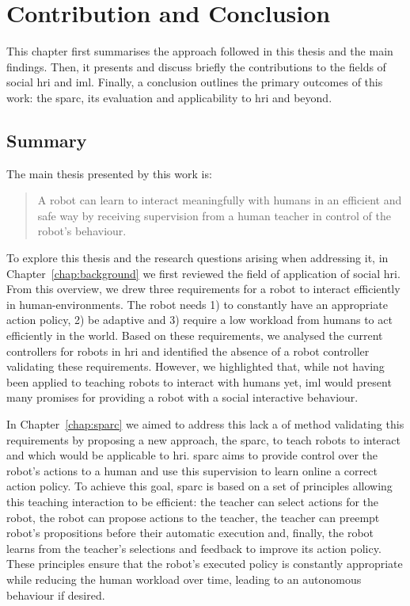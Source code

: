 \chapter{Contribution and Conclusion} \label{chap:conclusion}
\glsresetall

This chapter first summarises the approach followed in this thesis and the main findings. Then, it presents and discuss briefly the contributions to the fields of social \gls{hri} and \gls{iml}. Finally, a conclusion outlines the primary outcomes of this work: the \acrfull{sparc}, its evaluation and applicability to \gls{hri} and beyond.

\section{Summary}\label{sec:conc_summary}

The main thesis presented by this work is: 
\begin{quote}
	A robot can learn to interact meaningfully with humans in an efficient and safe way by receiving supervision from a human teacher in control of the robot's behaviour. 
\end{quote}

To explore this thesis and the research questions arising when addressing it, in Chapter~\ref{chap:background} we first reviewed the field of application of social \gls{hri}. From this overview, we drew three requirements for a robot to interact efficiently in human-environments. The robot needs 1) to constantly have an appropriate action policy, 2) be adaptive and 3) require a low workload from humans to act efficiently in the world. Based on these requirements, we analysed the current controllers for robots in \gls{hri} and identified the absence of a robot controller validating these requirements. However, we highlighted that, while not having been applied to teaching robots to interact with humans yet, \gls{iml} would present many promises for providing a robot with a social interactive behaviour.

In Chapter~\ref{chap:sparc} we aimed to address this lack a of method validating this requirements by proposing a new approach, the \gls{sparc}, to teach robots to interact and which would be applicable to \gls{hri}. \gls{sparc} aims to provide control over the robot's actions to a human and use this supervision to learn online a correct action policy. To achieve this goal, \gls{sparc} is based on a set of principles allowing this teaching interaction to be efficient: the teacher can select actions for the robot, the robot can propose actions to the teacher, the teacher can preempt robot's propositions before their automatic execution and, finally, the robot learns from the teacher's selections and feedback to improve its action policy. These principles ensure that the robot's executed policy is constantly appropriate while reducing the human workload over time, leading to an autonomous behaviour if desired.

